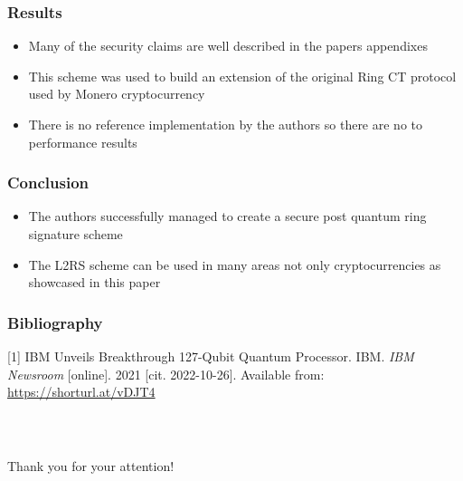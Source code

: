 \documentclass[%
  14pt,       				%
	c,                  %
	aspectratio=1610,   %
	unicode,						%
]{beamer}				    	%
\begin{document}
\begin{frame}
  \frametitle{Results}
  \large{
    \begin{itemize}
      \item Many of the security claims are well described in the papers appendixes
      \item This scheme was used to build an extension of the original Ring CT protocol used by Monero cryptocurrency
      \item There is no reference implementation by the authors so there are no to performance results
    \end{itemize}
  }
\end{frame}

\begin{frame}
  \frametitle{Conclusion}
  \large{
    \begin{itemize}
      \item The authors successfully managed to create a secure post quantum ring signature scheme
      \item The L2RS scheme can be used in many areas not only cryptocurrencies as showcased in this paper
    \end{itemize}
  }
\end{frame}

\begin{frame}
  \frametitle{Bibliography}
  \small{
    [1] IBM Unveils Breakthrough 127-Qubit Quantum Processor. IBM. \textit{IBM Newsroom} [online]. 2021 [cit. 2022-10-26]. Available from: \url{https://shorturl.at/vDJT4}
  }
\end{frame}

\begin{frame}[c]
  \frametitle{\mbox{ }}
  \begin{center}
    {\Huge Thank you for your attention!}
  \end{center}
\end{frame}
\end{document}
